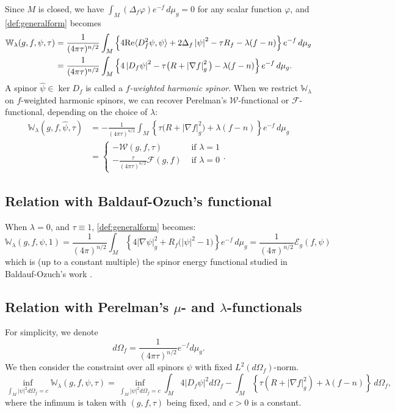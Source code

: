 \documentclass{amsart}
\theoremstyle{definition}
\theoremstyle{remark}
\numberwithin{equation}{section}
\newcommand{\abs}[1]{\left|#1\right|}
\begin{document}
Since $M$ is closed, we have $\displaystyle{\int_M (\Delta_f \varphi)e^{-f}\,d\mu_g = 0}$ for any scalar function $\varphi$, and \eqref{def:generalform} becomes
\begin{align*}
\mathbb{W}_\lambda(g, f, \psi,\tau) & = \frac{1}{(4\pi\tau)^{n/2}}\int_M \left\{4\textup{Re} \langle D_f^2 \psi ,\psi\rangle + 2\Delta_f\abs{\psi}^2 - \tau R_f - \lambda (f-n)\right\}e^{-f}\,d\mu_g\\
& = \frac{1}{(4\pi\tau)^{n/2}}\int_M \left\{4\abs{D_f\psi}^2 - \tau \big(R+\abs{\nabla f}_g^2\big) - \lambda (f-n)\right\} e^{-f}\,d\mu_g.
\end{align*}
A spinor $\hat\psi \in \ker D_f$ is called a \emph{$f$-weighted harmonic spinor}. When we restrict $\mathbb{W}_\lambda$ on $f$-weighted harmonic spinors, we can recover Perelman's $\mathcal{W}$-functional or $\mathcal{F}$-functional, depending on the choice of $\lambda$:
\begin{align*}
\mathbb{W}_\lambda(g,f,\hat\psi,\tau) & = -\frac{1}{(4\pi\tau)^{n/2}}\int_M \left\{\tau\big(R + \abs{\nabla f}_g^2\big) + \lambda(f - n)\right\}e^{-f}\,d\mu_g\\
& = \begin{cases}
-\mathcal{W}(g,f,\tau) & \text{ if } \lambda = 1\\
-\frac{\tau}{(4\pi\tau)^{n/2}}\mathcal{F}(g,f) & \text{ if } \lambda = 0
\end{cases}.
\end{align*}


\subsection{Relation with Baldauf-Ozuch's functional}
When $\lambda = 0$, and $\tau \equiv 1$, \eqref{def:generalform} becomes:
\[\mathbb{W}_\lambda(g,f,\psi,1) = \frac{1}{(4\pi)^{n/2}}\int_M \left\{4\abs{\nabla\psi}_g^2 + R_f\big(\abs{\psi}^2-1\big)\right\}e^{-f}\,d\mu_g = \frac{1}{(4\pi)^{n/2}}\mathcal{E}_g(f,\psi)\]
which is (up to a constant multiple) the spinor energy functional studied in Baldauf-Ozuch's work \cite{BO23}.

\subsection{Relation with Perelman's $\mu$- and $\lambda$-functionals}
\label{subsect:Perelman}
For simplicity, we denote
\[d\Omega_f = \frac{1}{(4\pi\tau)^{n/2}}e^{-f}d\mu_g.\]
We then consider the constraint over all spinors $\psi$ with fixed $L^2(d\Omega_f)$-norm.
\[\inf_{\int_M \abs{\psi}^2 d\Omega_f = c} \mathbb{W}_\lambda(g,f,\psi,\tau) = \inf_{\int_M \abs{\psi}^2 d\Omega_f = c}\int_M 4\abs{D_f\psi}^2 d\Omega_f - \int_M \left\{\tau(R + \abs{\nabla f}^2_g) + \lambda(f-n)\right\}\,d\Omega_f,\]
where the infimum is taken with $(g,f,\tau)$ being fixed, and $c > 0$ is a constant. 
\end{document}
